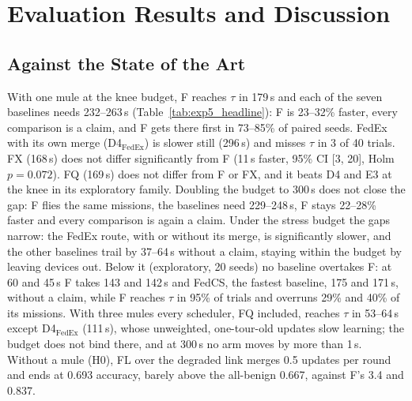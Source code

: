 \documentclass[conference]{IEEEtran}
\begin{document}
\section{Evaluation Results and Discussion}
\label{sec:results}

\subsection{Against the State of the Art}
\label{sec:res:sota}

With one mule at the knee budget, F reaches $\tau$ in 179\,s and each of the
seven baselines needs 232--263\,s (Table~\ref{tab:exp5_headline}): F is
23--32\% faster, every comparison is a claim, and F gets there first in
73--85\% of paired seeds. FedEx with its own merge (D4$_{\text{FedEx}}$) is
slower still (296\,s) and misses $\tau$ in 3 of 40 trials. FX (168\,s) does not
differ significantly from F (11\,s faster, 95\% CI [3, 20], Holm $p=0.072$).
FQ (169\,s) does not differ from F or FX, and it beats D4 and E3 at the knee in
its exploratory family. Doubling the budget to 300\,s does not close the gap: F
flies the same missions, the baselines need 229--248\,s, F stays 22--28\% faster
and every comparison is again a claim. Under the stress budget the gaps narrow:
the FedEx route, with or without its merge, is significantly slower, and the other
baselines trail by 37--64\,s without a claim, staying within the budget by
leaving devices out. Below it (exploratory, 20 seeds) no baseline overtakes F: at
60 and 45\,s F takes 143 and 142\,s and FedCS, the fastest baseline, 175 and
171\,s, without a claim, while F reaches $\tau$ in 95\% of trials and overruns
29\% and 40\% of its missions. With three mules every scheduler, FQ included, reaches
$\tau$ in 53--64\,s except D4$_{\text{FedEx}}$ (111\,s), whose unweighted, one-tour-old
updates slow learning; the budget does not bind there, and at 300\,s no arm moves
by more than 1\,s. Without a mule (H0), FL over the degraded link merges
0.5 updates per round and ends at 0.693 accuracy, barely above the all-benign
0.667, against F's 3.4 and 0.837.
\end{document}
